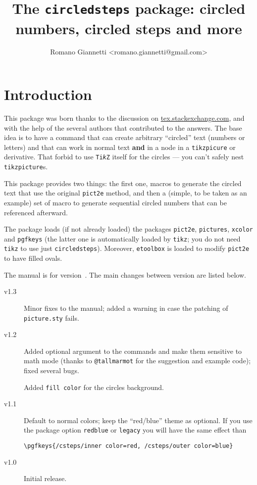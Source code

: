 \documentclass{ltxdoc}
\title{The \texttt{circledsteps} package: circled numbers, circled steps and more}
\author{Romano Giannetti <romano.giannetti@gmail.com>}
\begin{document}
\maketitle

\section{Introduction}

This package was born thanks to the discussion on \href{https://tex.stackexchange.com/questions/7032/good-way-to-make-textcircled-numbers}{tex.stackexchange.com}, and with the help of the several authors that contributed to the answers. The base idea is to have a command that can create arbitrary ``circled'' text (numbers or letters) and that can work in normal text \textbf{and} in a node in a \texttt{tikzpicure} or derivative. That forbid to use \texttt{Ti\emph{k}Z} itself for the circles --- you can't safely nest \texttt{tikzpicture}s.

This package provides two things: the first one, macros to generate the circled text that use the original \texttt{pict2e} method, and then a (simple, to be taken as an example) set of macro to generate sequential circled numbers that can be referenced afterward.

The package loads (if not already loaded) the packages \texttt{pict2e}, \texttt{pictures}, \texttt{xcolor} and \texttt{pgfkeys} (the latter one is automatically loaded by \texttt{tikz}; you do not need \texttt{tikz} to use just \texttt{circledsteps}). Moreover, \texttt{etoolbox} is loaded to modify \texttt{pict2e} to have filled ovals.

The manual is for version~\cstepsversion. The main changes between version are listed below.
\begin{description}
    \item[v1.3] Minor fixes to the manual; added a warning in case the patching of \texttt{picture.sty} fails.
    \item[v1.2] Added optional argument to the commands and make them sensitive to math mode (thanks to \texttt{@tallmarmot} for the suggestion and example code); fixed several bugs.

        Added \texttt{fill color} for the circles background.
    \item[v1.1] Default to normal colors; keep the ``red/blue'' theme as optional.
        If you use the package option \texttt{redblue} or \texttt{legacy} you will have the same effect than
        \begin{lstlisting}[]
    \pgfkeys{/csteps/inner color=red, /csteps/outer color=blue}
        \end{lstlisting}
    \item[v1.0] Initial release.
\end{description}
\end{document}
